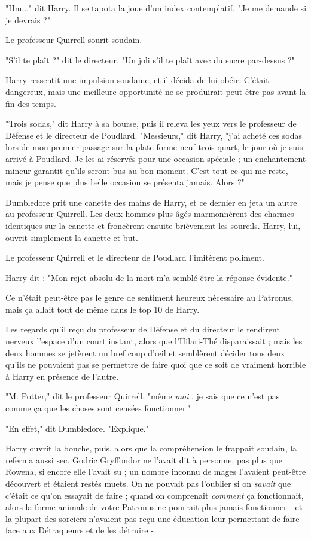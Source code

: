 "Hm..." dit Harry. Il se tapota la joue d'un index contemplatif. "Je me demande si je devrais ?"

Le professeur Quirrell sourit soudain.

"S'il te plaît ?" dit le directeur. "Un joli s'il te plaît avec du sucre par-dessus ?"

Harry ressentit une impulsion soudaine, et il décida de lui obéir. C'était dangereux, mais une meilleure opportunité ne se produirait peut-être pas avant la fin des temps.

"Trois sodas," dit Harry à sa bourse, puis il releva les yeux vers le professeur de Défense et le directeur de Poudlard. "Messieurs," dit Harry, "j'ai acheté ces sodas lors de mon premier passage sur la plate-forme neuf trois-quart, le jour où je suis arrivé à Poudlard. Je les ai réservés pour une occasion spéciale ; un enchantement mineur garantit qu'ils seront bus au bon moment. C'est tout ce qui me reste, mais je pense que plus belle occasion se présenta jamais. Alors ?"

Dumbledore prit une canette des mains de Harry, et ce dernier en jeta un autre au professeur Quirrell. Les deux hommes plus âgés marmonnèrent des charmes identiques sur la canette et froncèrent ensuite brièvement les sourcils. Harry, lui, ouvrit simplement la canette et but.

Le professeur Quirrell et le directeur de Poudlard l'imitèrent poliment.

Harry dit : "Mon rejet absolu de la mort m'a semblé être la réponse évidente."

Ce n'était peut-être pas le genre de sentiment heureux nécessaire au Patronus, mais ça allait tout de même dans le top 10 de Harry.

Les regards qu'il reçu du professeur de Défense et du directeur le rendirent nerveux l'espace d'un court instant, alors que l'Hilari-Thé disparaissait ; mais les deux hommes se jetèrent un bref coup d'œil et semblèrent décider tous deux qu'ils ne pouvaient pas se permettre de faire quoi que ce soit de vraiment horrible à Harry en présence de l'autre.

"M. Potter," dit le professeur Quirrell, "même \emph{moi} , je sais que ce n'est pas comme ça que les choses sont censées fonctionner."

"En effet," dit Dumbledore. "Explique."

Harry ouvrit la bouche, puis, alors que la compréhension le frappait soudain, la referma aussi sec. Godric Gryffondor ne l'avait dit à personne, pas plus que Rowena, si encore elle l'avait su ; un nombre inconnu de mages l'avaient peut-être découvert et étaient restés muets. On ne pouvait pas l'oublier si on \emph{savait}  que c'était ce qu'on essayait de faire ; quand on comprenait \emph{comment}  ça fonctionnait, alors la forme animale de votre Patronus ne pourrait plus jamais fonctionner - et la plupart des sorciers n'avaient pas reçu une éducation leur permettant de faire face aux Détraqueurs et de les détruire -

